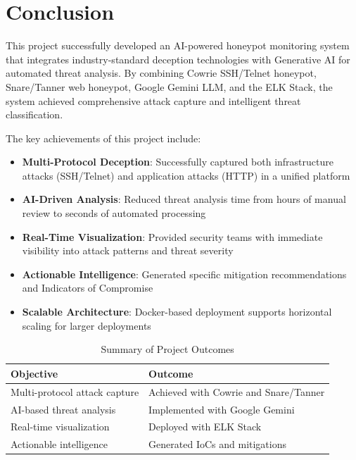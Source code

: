 \documentclass[12pt,a4paper]{report}
\begin{document}
\section{Conclusion}

This project successfully developed an AI-powered honeypot monitoring system that integrates industry-standard deception technologies with Generative AI for automated threat analysis. By combining Cowrie SSH/Telnet honeypot, Snare/Tanner web honeypot, Google Gemini LLM, and the ELK Stack, the system achieved comprehensive attack capture and intelligent threat classification.

The key achievements of this project include:

\begin{itemize}
\item \textbf{Multi-Protocol Deception}: Successfully captured both infrastructure attacks (SSH/Telnet) and application attacks (HTTP) in a unified platform
\item \textbf{AI-Driven Analysis}: Reduced threat analysis time from hours of manual review to seconds of automated processing
\item \textbf{Real-Time Visualization}: Provided security teams with immediate visibility into attack patterns and threat severity
\item \textbf{Actionable Intelligence}: Generated specific mitigation recommendations and Indicators of Compromise
\item \textbf{Scalable Architecture}: Docker-based deployment supports horizontal scaling for larger deployments
\end{itemize}

\begin{table}[h]
\centering
\caption{Summary of Project Outcomes}
\label{tab:project_outcomes}
\begin{tabular}{|l|p{8cm}|}
\hline
\textbf{Objective} & \textbf{Outcome} \\
\hline
Multi-protocol attack capture & Achieved with Cowrie and Snare/Tanner \\
\hline
AI-based threat analysis & Implemented with Google Gemini \\
\hline
Real-time visualization & Deployed with ELK Stack \\
\hline
Actionable intelligence & Generated IoCs and mitigations \\
\hline
\end{tabular}
\end{table}
\end{document}
